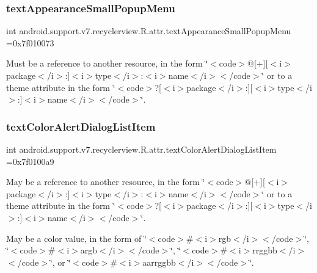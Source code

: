 \subsubsection{\texorpdfstring{text\+Appearance\+Small\+Popup\+Menu}{textAppearanceSmallPopupMenu}}
{\footnotesize\ttfamily int android.\+support.\+v7.\+recyclerview.\+R.\+attr.\+text\+Appearance\+Small\+Popup\+Menu =0x7f010073\hspace{0.3cm}{\ttfamily [static]}}

Must be a reference to another resource, in the form \char`\"{}$<$code$>$@\mbox{[}+\mbox{]}\mbox{[}$<$i$>$package$<$/i$>$\+:\mbox{]}$<$i$>$type$<$/i$>$\+:$<$i$>$name$<$/i$>$$<$/code$>$\char`\"{} or to a theme attribute in the form \char`\"{}$<$code$>$?\mbox{[}$<$i$>$package$<$/i$>$\+:\mbox{]}\mbox{[}$<$i$>$type$<$/i$>$\+:\mbox{]}$<$i$>$name$<$/i$>$$<$/code$>$\char`\"{}. \mbox{\label{classandroid_1_1support_1_1v7_1_1recyclerview_1_1R_1_1attr_a707374c8710d8713e90c32a5844e25c7}} 
\subsubsection{\texorpdfstring{text\+Color\+Alert\+Dialog\+List\+Item}{textColorAlertDialogListItem}}
{\footnotesize\ttfamily int android.\+support.\+v7.\+recyclerview.\+R.\+attr.\+text\+Color\+Alert\+Dialog\+List\+Item =0x7f0100a9\hspace{0.3cm}{\ttfamily [static]}}

May be a reference to another resource, in the form \char`\"{}$<$code$>$@\mbox{[}+\mbox{]}\mbox{[}$<$i$>$package$<$/i$>$\+:\mbox{]}$<$i$>$type$<$/i$>$\+:$<$i$>$name$<$/i$>$$<$/code$>$\char`\"{} or to a theme attribute in the form \char`\"{}$<$code$>$?\mbox{[}$<$i$>$package$<$/i$>$\+:\mbox{]}\mbox{[}$<$i$>$type$<$/i$>$\+:\mbox{]}$<$i$>$name$<$/i$>$$<$/code$>$\char`\"{}. 

May be a color value, in the form of \char`\"{}$<$code$>$\#$<$i$>$rgb$<$/i$>$$<$/code$>$\char`\"{}, \char`\"{}$<$code$>$\#$<$i$>$argb$<$/i$>$$<$/code$>$\char`\"{}, \char`\"{}$<$code$>$\#$<$i$>$rrggbb$<$/i$>$$<$/code$>$\char`\"{}, or \char`\"{}$<$code$>$\#$<$i$>$aarrggbb$<$/i$>$$<$/code$>$\char`\"{}. \mbox{\label{classandroid_1_1support_1_1v7_1_1recyclerview_1_1R_1_1attr_a15f67c582296fda450cef82a5e1f28af}} 

